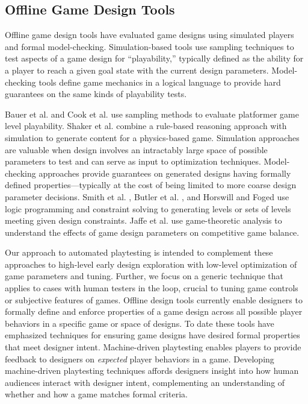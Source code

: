 \documentclass{sig-alternate}
\begin{document}
\subsection{Offline Game Design Tools}
Offline game design tools have evaluated game designs using simulated players and formal model-checking.
Simulation-based tools use sampling techniques to test aspects of a game design for ``playability,'' typically defined as the ability for a player to reach a given goal state with the current design parameters.
Model-checking tools define game mechanics in a logical language to provide hard guarantees on the same kinds of playability tests.

Bauer et al. \cite{bauer2013:rrt-generation} and Cook et al. \cite{cook2012:coopcoevo} use sampling methods to evaluate platformer game level playability.
Shaker et al. \cite{shaker2013:ropossum-test} combine a rule-based reasoning approach with simulation to generate content for a physics-based game.
Simulation approaches are valuable when design involves an intractably large space of possible parameters to test and can serve as input to optimization techniques.
%
Model-checking approaches provide guarantees on generated designs having formally defined properties---typically at the cost of being limited to more coarse design parameter decisions.
Smith et al. \cite{smith2013:quantify-play}, Butler et al. \cite{butler2013:progression-tool}, and Horswill and Foged \cite{horswill2012:levelgen} use logic programming and constraint solving to generating levels or sets of levels meeting given design constraints.
Jaffe et al. \cite{jaffe2012:balance} use game-theoretic analysis to understand the effects of game design parameters on competitive game balance.

Our approach to automated playtesting is intended to complement these approaches to high-level early design exploration with low-level optimization of game parameters and tuning.
Further, we focus on a generic technique that applies to cases with human testers in the loop, crucial to tuning game controls or subjective features of games.
%
Offline design tools currently enable designers to formally define and enforce properties of a game design across all possible player behaviors in a specific game or space of designs.
To date these tools have emphasized techniques for ensuring game designs have desired formal properties that meet designer intent.
%
Machine-driven playtesting enables players to provide feedback to designers on \textit{expected} player behaviors in a game.
Developing machine-driven playtesting techniques affords designers insight into how human audiences interact with designer intent, complementing an understanding of whether and how a game matches formal criteria.
\end{document}
